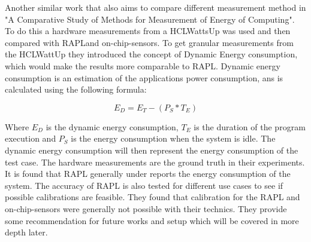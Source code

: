 Another similar work that also aims to compare different measurement method in "A Comparative Study of Methods for Measurement of Energy of Computing"\cite{fahad2019comparative}. To do this a hardware measurements from a HCLWattsUp was used and then compared with RAPLand on-chip-sensors. To get granular measurements from the HCLWattUp they introduced the concept of Dynamic Energy consumption, which would make the results more comparable to RAPL. Dynamic energy consumption is an estimation of the applications power consumption, ans is calculated using the following formula:

\begin{equation}
    E_D = E_T -(P_S * T_E)
\end{equation}

Where $E_D$ is the dynamic energy consumption, $T_E$ is the duration of the program execution and $P_S$ is the energy consumption when the system is idle. The dynamic energy consumption will then represent the energy consumption of the test case. The hardware measurements are the ground truth in their experiments. It is found that RAPL generally under reports the energy consumption of the system. The accuracy of RAPL is also tested for different use cases to see if possible calibrations are feasible. They found that calibration for the RAPL and on-chip-sensors were generally not possible with their technics. They provide some recommendation for future works and setup which will be covered in more depth later.
